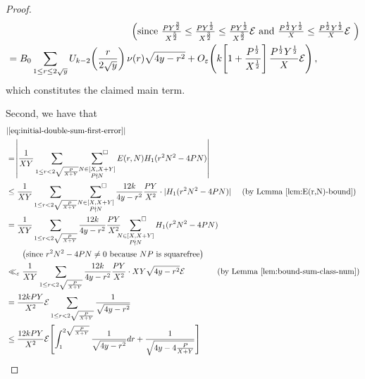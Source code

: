 \documentclass[12pt,letterpaper,reqno]{amsart}
\theoremstyle{plain}
\theoremstyle{definition}
\numberwithin{equation}{section}
\numberwithin{figure}{section}
\numberwithin{table}{section}
\newcommand{\lrabs}[1]{\!\left\lvert #1 \right\lvert}
\newcommand{\lrp}[1]{\!\left(#1\right)}
\newcommand{\lrb}[1]{\!\left[#1\right]}
\newcommand{\EE}{\mathcal{E}}
\begin{document}
\begin{proof}
\begin{align}
        & \hspace{45mm} \text{\Big(since $\tfrac{PY^\frac{3}{2}}{X^{\frac{5}{2}}} \le \tfrac{P Y^\frac{1}{2}}{X^\frac{3}{2}} \le \tfrac{P Y^\frac{1}{2}}{X^\frac{3}{2}} \EE$ and $\tfrac{P^\frac{1}{2}Y^\frac{1}{2}}{X} \le \tfrac{P^\frac{1}{2}Y^\frac{1}{2}}{X} \EE$ \Big)} \\
        &= B_0 \sum_{1\leq r\le 2\sqrt{y}} U_{k-2}\lrp{\frac{r}{2\sqrt{y}}}\nu(r) \sqrt{4y-r^2}   +
        O_\varepsilon \lrp{k\lrb{
            1
            +
            \frac{P^\frac{1}{2}}{X^\frac{1}{2}}
        } \frac{P^\frac{1}{2}Y^\frac{1}{2}}{X} \EE},
    \end{align}
    which constitutes the claimed main term.

    

    Second, we have that
    \begin{align}
        &|\eqref{eq:initial-double-sum-first-error}| \\
        &=
        \lrabs{
        \frac{1}{XY}\sum_{1\leq r< 2\sqrt{\frac{P}{X+Y}}} \ \sideset{}{^\square}\sum_{\substack{N\in[X,X+Y]\\ P\nmid N}} E(r,N)H_1(r^2N^2-4PN) 
        }\\
        &\le 
        \frac{1}{XY}\sum_{1\leq r< 2\sqrt{\frac{P}{X+Y}}} \ \sideset{}{^\square}\sum_{\substack{N\in[X,X+Y]\\ P\nmid N}} 
        \frac{12k}{4y-r^2} \frac{PY}{X^2}
        \cdot
        |H_1(r^2N^2-4PN)|
        \quad\ \text{(by Lemma \ref{lem:E(r,N)-bound})}
        \\
        &= \frac{1}{XY}\sum_{1\leq r< 2\sqrt{\frac{P}{X+Y}}} \frac{12k}{4y-r^2} \frac{PY}{X^2} \sideset{}{^\square}\sum_{\substack{N\in[X,X+Y]\\ P\nmid N}} H_1(r^2N^2-4PN) \\
        &\qquad \text{\big(since $r^2N^2-4PN \ne 0$ because $NP$ is squarefree\big)} \\
        &\ll_\varepsilon \frac{1}{XY}\sum_{1\leq r< 2\sqrt{\frac{P}{X+Y}}} \frac{12k}{4y-r^2} \frac{PY}{X^2} \cdot  
            XY \sqrt{4y-r^2} \EE \qquad\qquad \text{(by Lemma \ref{lem:bound-sum-class-num})}
        \\
        &= \frac{12kPY}{X^2} 
            \EE
        \sum_{1\leq r< 2\sqrt{\frac{P}{X+Y}}} \frac{1}{\sqrt{4y-r^2}} \\
        &\le \frac{12kPY}{X^2} 
            \EE
        \lrb{
            \int_1^{2 \sqrt{\frac{P}{X+Y}}} \frac{1}{\sqrt{4y-r^2}} dr
            + 
            \frac{1}{\sqrt{4y-4\frac{P}{X+Y}}}
}
\end{align}
\end{proof}
\end{document}

